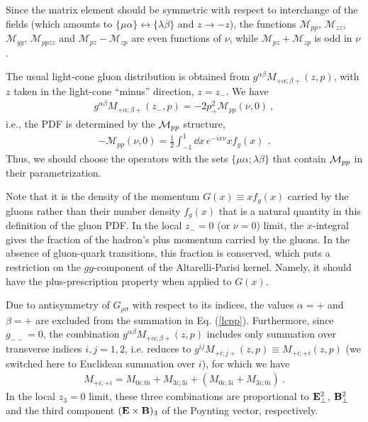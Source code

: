 Since the matrix element should be symmetric with respect to interchange of the
fields (which amounts to $\{\mu \alpha\} \leftrightarrow \{\lambda \beta\}$ and $z \to -z$),
the functions $\mathcal{M}_{pp}$, $\mathcal{M}_{zz}$, $\mathcal{M}_{gg}$, $\mathcal{M}_{ppzz}$ and
$\mathcal{M}_{pz} - \mathcal{M}_{zp}$ are
even functions of $\nu$, while $\mathcal{M}_{pz} + \mathcal{M}_{zp}$ is
odd in $\nu$.

The usual light-cone gluon distribution is obtained from
$g^{\alpha \beta} { M}_{+ \alpha; \beta +} (z,p)$, with $z$ taken in the light-cone ``minus'' direction,
$z=z_-$. We have
\begin{align}
g^{\alpha \beta} { M}_{+ \alpha; \beta +} (z_-,p) =-2 p_+ ^2 \mathcal{M}_{pp}(\nu ,0) \ ,
\label{lcpp}
\end{align}
i.e., the PDF is determined by the ${\cal M}_{pp}$ structure,
\begin{align}
- \mathcal{M}_{pp} (\nu,0) =\frac12
\int_{-1}^1 \dd x \, e^{-i x \nu} x f_g (x) \, \ .
\label{glPDF}
\end{align}
Thus, we should choose the operators with the sets
$\{\mu \alpha; \lambda \beta \}$ that contain ${\cal M}_{pp}$
in their parametrization.

Note that it is the density of the momentum \mbox{$G(x) \equiv x f_g (x)$}
carried by the gluons rather than their number
density $f_g (x)$ that is a natural quantity in this definition of the gluon PDF.
In the local $z_-=0$ (or $\nu=0$) limit, the $x$-integral gives the fraction of the
hadron's plus momentum carried by the gluons.
In the absence of gluon-quark transitions, this fraction is conserved,
which puts a restriction on the $gg$-component of the Altarelli-Parisi \cite{Altarelli:1977zs} kernel.
Namely, it should have the plus-prescription
property when applied to $G(x)$.

Due to antisymmetry of $G_{\rho \sigma}$ with respect to its indices,
the values $\alpha=+$ and $\beta= +$ are excluded from the summation in Eq. (\ref{lcpp}).
Furthermore, since $g_{- -} =0$, the combination
$g^{\alpha \beta} { M}_{+ \alpha; \beta +} (z,p)$ includes only summation over
transverse indices $i,j =1,2$, i.e. reduces
to $g^{ij} { M}_{+ i; j +} (z,p) \equiv { M}_{+ i; + i} (z,p)$
(we switched here to Euclidean summation over $i$), for which we have
\begin{align}
{ M}_{+ i; +i}
= { M}_{0 i; 0i} + { M}_{3 i; 3i} + ({ M}_{0 i; 3i} +
{ M}_{3 i; 0i}) \ .
\label{ii}
\end{align}
In the local $z_3=0$ limit, these three combinations are proportional to ${\bf E}^2_\perp$, ${\bf B}^2_\perp$
and the third component $({\bf E \times B})_3$ of the Poynting vector,
respectively.

